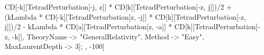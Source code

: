 CD[-k][TetradPerturbation[-j, z]] * CD[k][TetradPerturbation[-z, j]])/2 + (kLambda * CD[-k][TetradPerturbation[z, -j]] * CD[k][TetradPerturbation[-z, j]])/2 - kLambda * CD[a][TetradPerturbation[z, -a]] * CD[k][TetradPerturbation[-z, -k]], TheoryName -> "GeneralRelativity", Method -> "Easy", MaxLaurentDepth -> 3]; , -100]